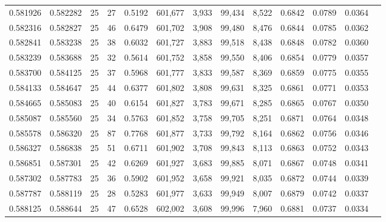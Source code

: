 \begin{tabular}{rrrrrrrrrrrrr}
0.581926 & 0.582282 &    25 &  27 &                                     0.5192 & 601,677 &   3,933 &  99,434 &   8,522 & 0.6842 & 0.0789 & 0.0364 \\
0.582316 & 0.582827 &    25 &  46 &                                     0.6479 & 601,702 &   3,908 &  99,480 &   8,476 & 0.6844 & 0.0785 & 0.0362 \\
0.582841 & 0.583238 &    25 &  38 &                                     0.6032 & 601,727 &   3,883 &  99,518 &   8,438 & 0.6848 & 0.0782 & 0.0360 \\
0.583239 & 0.583688 &    25 &  32 &                                     0.5614 & 601,752 &   3,858 &  99,550 &   8,406 & 0.6854 & 0.0779 & 0.0357 \\
0.583700 & 0.584125 &    25 &  37 &                                     0.5968 & 601,777 &   3,833 &  99,587 &   8,369 & 0.6859 & 0.0775 & 0.0355 \\
0.584133 & 0.584647 &    25 &  44 &                                     0.6377 & 601,802 &   3,808 &  99,631 &   8,325 & 0.6861 & 0.0771 & 0.0353 \\
0.584665 & 0.585083 &    25 &  40 &                                     0.6154 & 601,827 &   3,783 &  99,671 &   8,285 & 0.6865 & 0.0767 & 0.0350 \\
0.585087 & 0.585560 &    25 &  34 &                                     0.5763 & 601,852 &   3,758 &  99,705 &   8,251 & 0.6871 & 0.0764 & 0.0348 \\
0.585578 & 0.586320 &    25 &  87 &                                     0.7768 & 601,877 &   3,733 &  99,792 &   8,164 & 0.6862 & 0.0756 & 0.0346 \\
0.586327 & 0.586838 &    25 &  51 &                                     0.6711 & 601,902 &   3,708 &  99,843 &   8,113 & 0.6863 & 0.0752 & 0.0343 \\
0.586851 & 0.587301 &    25 &  42 &                                     0.6269 & 601,927 &   3,683 &  99,885 &   8,071 & 0.6867 & 0.0748 & 0.0341 \\
0.587302 & 0.587783 &    25 &  36 &                                     0.5902 & 601,952 &   3,658 &  99,921 &   8,035 & 0.6872 & 0.0744 & 0.0339 \\
0.587787 & 0.588119 &    25 &  28 &                                     0.5283 & 601,977 &   3,633 &  99,949 &   8,007 & 0.6879 & 0.0742 & 0.0337 \\
0.588125 & 0.588644 &    25 &  47 &                                     0.6528 & 602,002 &   3,608 &  99,996 &   7,960 & 0.6881 & 0.0737 & 0.0334 \\

\end{tabular}
